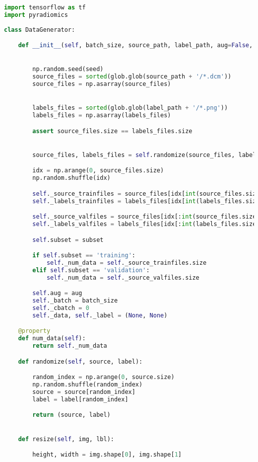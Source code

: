 \documentclass{standalone}
\begin{document}
\begin{lstlisting}[language = python, caption=Custom $\mathtt{DataGenerator}$ implementation]
import tensorflow as tf
import pyradiomics
    
class DataGenerator:

    def __init__(self, batch_size, source_path, label_path, aug=False, seed=123, validation_split=0., subset='training'):


        np.random.seed(seed)
        source_files = sorted(glob.glob(source_path + '/*.dcm'))
        source_files = np.asarray(source_files)


        labels_files = sorted(glob.glob(label_path + '/*.png'))
        labels_files = np.asarray(labels_files)

        assert source_files.size == labels_files.size


        source_files, labels_files = self.randomize(source_files, labels_files)

        idx = np.arange(0, source_files.size)
        np.random.shuffle(idx)

        self._source_trainfiles = source_files[idx[int(source_files.size * validation_split):]]
        self._labels_trainfiles = labels_files[idx[int(labels_files.size * validation_split):]]

        self._source_valfiles = source_files[idx[:int(source_files.size * validation_split)]]
        self._labels_valfiles = labels_files[idx[:int(labels_files.size * validation_split)]]

        self.subset = subset

        if self.subset == 'training':
            self._num_data = self._source_trainfiles.size
        elif self.subset == 'validation':
            self._num_data = self._source_valfiles.size

        self.aug = aug
        self._batch = batch_size
        self._cbatch = 0
        self._data, self._label = (None, None)

    @property
    def num_data(self):
        return self._num_data

    def randomize(self, source, label):

        random_index = np.arange(0, source.size)
        np.random.shuffle(random_index)
        source = source[random_index]
        label = label[random_index]

        return (source, label)


    def resize(self, img, lbl):

        height, width = img.shape[0], img.shape[1]


\end{lstlisting}
\end{document}
